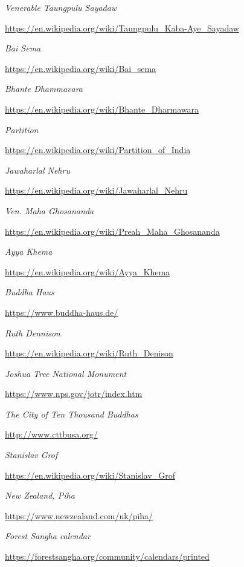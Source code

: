\begin{thebibliography}{9}
 \emph{Venerable Taungpulu Sayadaw}

  {\urlsize \url{https://en.wikipedia.org/wiki/Taungpulu_Kaba-Aye_Sayadaw}}

 \emph{Bai Sema}

  {\urlsize \url{https://en.wikipedia.org/wiki/Bai_sema}}

 \emph{Bhante Dhammavara}

  {\urlsize \url{https://en.wikipedia.org/wiki/Bhante_Dharmawara}}

 \emph{Partition}

  {\urlsize \url{https://en.wikipedia.org/wiki/Partition_of_India}}

 \emph{Jawaharlal Nehru}

  {\urlsize \url{https://en.wikipedia.org/wiki/Jawaharlal_Nehru}}

 \emph{Ven. Maha Ghosananda}

  {\urlsize \url{https://en.wikipedia.org/wiki/Preah_Maha_Ghosananda}}

 \emph{Ayya Khema}

  {\urlsize \url{https://en.wikipedia.org/wiki/Ayya_Khema}}

 \emph{Buddha Haus}

  {\urlsize \url{https://www.buddha-haus.de/}}

 \emph{Ruth Dennison}

  {\urlsize \url{https://en.wikipedia.org/wiki/Ruth_Denison}}

 \emph{Joshua Tree National Monument}

  {\urlsize \url{https://www.nps.gov/jotr/index.htm}}

 \emph{The City of Ten Thousand Buddhas}

  {\urlsize \url{http://www.cttbusa.org/}}

 \emph{Stanislav Grof}

  {\urlsize \url{https://en.wikipedia.org/wiki/Stanislav_Grof}}

 \emph{New Zealand, Piha}

  {\urlsize \url{https://www.newzealand.com/uk/piha/}}

 \emph{Forest Sangha calendar}

  {\urlsize \url{https://forestsangha.org/community/calendars/printed}}


\end{thebibliography}
